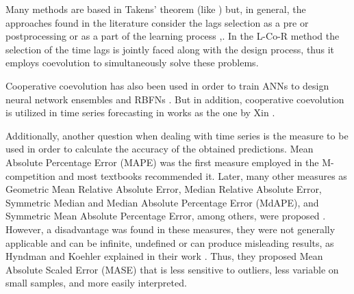 \documentclass[a4paper,twoside]{article}
\newcommand{\metodo}{L-Co-R}
\begin{document}
Many methods are based in Takens' theorem (like \cite{Luko2010}) but, in general, the approaches found in the literature consider the lags selection as a pre or postprocessing or as a part of the learning process \cite{Araujo2010a},\cite{Maus2011}. In the {\metodo} method the selection of the time lags is jointly faced along with the design process, thus it employs coevolution to simultaneously solve these problems.


Cooperative coevolution \cite{Potter94} has also been used in order to train ANNs to design neural network ensembles \cite{Garcia-Pedrajas05} and RBFNs \cite{Li08}. But in addition, cooperative coevolution is utilized in time series forecasting in works as the one by Xin \cite{Xin10}. %


Additionally, another question when dealing with time series is the measure to be used in order to calculate the accuracy of the obtained predictions. Mean Absolute Percentage Error (MAPE) \cite{Bowerman2004} was the first measure employed in the M-competition \cite{Makridakis1982} and most textbooks recommended it. Later, many other measures as Geometric Mean Relative Absolute Error, Median Relative Absolute Error, Symmetric Median and Median Absolute Percentage Error (MdAPE), and Symmetric Mean Absolute Percentage Error, among others, were proposed \cite{Makridakis2000}. However, a disadvantage was found in these measures, they were not generally applicable and can be infinite, undefined or can produce misleading results, as Hyndman and Koehler explained in their work \cite{Hyndman2006}. Thus, they proposed Mean Absolute Scaled Error (MASE) that is less sensitive to outliers, less variable on small samples, and more easily interpreted.
\end{document}
